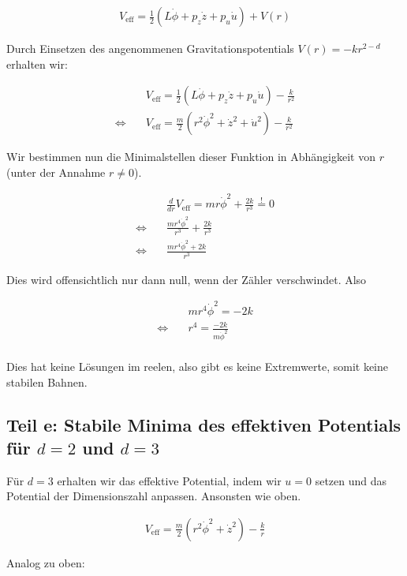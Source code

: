 \documentclass[a4paper,german,12pt,smallheadings]{scrartcl}
\begin{document}
\begin{align*}
  V_{\text{eff}} = \frac{1}{2}(L\dot{\phi} + p_z\dot{z} + p_u \dot{u}) + V(r)
\end{align*}

Durch Einsetzen des angenommenen Gravitationspotentials $V(r) = -kr^{2-d}$
erhalten wir:

\begin{align*}
  &V_{\text{eff}} = \frac{1}{2}(L\dot{\phi} + p_z\dot{z} + p_u \dot{u}) - \frac{k}{r^2} \\
  \Leftrightarrow\quad&V_{\text{eff}} = \frac{m}{2}(r^2\dot{\phi}^2 + \dot{z}^2 + \dot{u}^2) - \frac{k}{r^2}
\end{align*}

Wir bestimmen nun die Minimalstellen dieser Funktion in Abhängigkeit von $r$
(unter der Annahme $r \neq 0$).

\begin{align*}
  &\frac{d}{dr} V_{\text{eff}} = mr\dot{\phi}^2 + \frac{2k}{r^3} \overset{!}{=} 0 \\
  \Leftrightarrow\quad&\frac{mr^4\dot{\phi}^2}{r^3} + \frac{2k}{r^3} \\
  \Leftrightarrow\quad&\frac{mr^4\dot{\phi}^2 + 2k}{r^3}
\end{align*}

Dies wird offensichtlich nur dann null, wenn der Zähler verschwindet. Also

\begin{align*}
  &mr^4\dot{\phi}^2 = -2k \\
  \Leftrightarrow\quad &r^4 = \frac{-2k}{m\dot{\phi}^2} \\
\end{align*}

Dies hat keine Lösungen im reelen, also gibt es keine Extremwerte, somit keine stabilen Bahnen.

\subsection*{Teil e: Stabile Minima des effektiven Potentials für $d=2$ und $d=3$}

Für $d = 3$ erhalten wir das effektive Potential, indem wir $u = 0$ setzen und
das Potential der Dimensionszahl anpassen. Ansonsten wie oben.

\begin{align*}
  V_{\text{eff}} = \frac{m}{2}(r^2\dot{\phi}^2 + \dot{z}^2) - \frac{k}{r}
\end{align*}

Analog zu oben:
\end{document}
